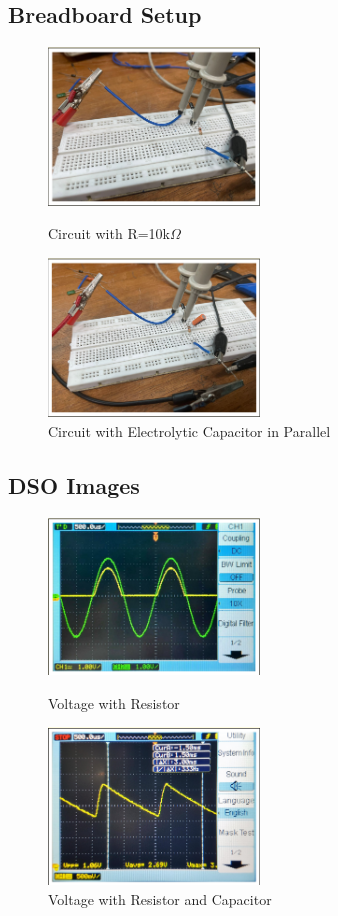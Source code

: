 \documentclass{article}
\begin{document}
\subsection{Breadboard Setup}
\begin{figure}[h!]
\centering
    \includegraphics[width=0.5\textwidth]{pic2.png}
    \caption{Circuit with R=10k$\Omega$}
    \includegraphics[width=0.5\textwidth]{pic3.png}
    \caption{Circuit with Electrolytic Capacitor in
Parallel}
\end{figure}
\newpage
\subsection{DSO Images}

\begin{figure}[h]
\centering
    \includegraphics[width=0.5\textwidth]{pic4.png}
    \caption{Voltage with Resistor}
    \includegraphics[width=0.5\textwidth]{pic5.png}
    \caption{Voltage with Resistor and Capacitor}
\end{figure}
\end{document}
